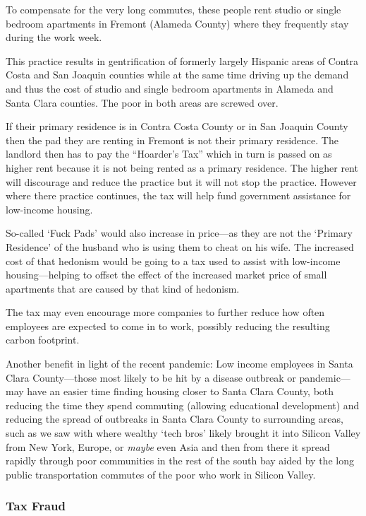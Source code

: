 To compensate for the very long commutes, these people rent studio or single bedroom apartments in Fremont (Alameda County) where they frequently stay during the work week.

This practice results in gentrification of formerly largely Hispanic areas of Contra Costa and San Joaquin counties while at the same time driving up the demand and thus the cost of studio and single bedroom apartments in Alameda and Santa Clara counties. The poor in both areas are screwed over.

If their primary residence is in Contra Costa County or in San Joaquin County then the pad they are renting in Fremont is not their primary residence. The landlord then has to pay the ``Hoarder's Tax'' which in turn is passed on as higher rent because it is not being rented as a primary residence. The higher rent will discourage and reduce the practice but it will not stop the practice. However where there practice continues, the tax will help fund government assistance for low-income housing.

So-called `Fuck Pads' would also increase in price---as they are not the `Primary Residence' of the husband who is using them to cheat on his wife. The increased cost of that hedonism would be going to a tax used to assist with low-income housing---helping to offset the effect of the increased market price of small apartments that are caused by that kind of hedonism.

The tax may even encourage more companies to further reduce how often employees are expected to come in to work, possibly reducing the resulting carbon footprint.

Another benefit in light of the recent pandemic: Low income employees in Santa Clara County---those most likely to be hit by a disease outbreak or pandemic---may have an easier time finding housing closer to Santa Clara County, both reducing the time they spend commuting (allowing educational development) and reducing the spread of outbreaks in Santa Clara County to surrounding areas, such as we saw with \covid{} where wealthy `tech bros' likely brought it into Silicon Valley from New York, Europe, or \emph{maybe} even Asia and then from there it spread rapidly through poor communities in the rest of the south bay aided by the long public transportation commutes of the poor who work in Silicon Valley.

\subsubsection{Tax Fraud}

